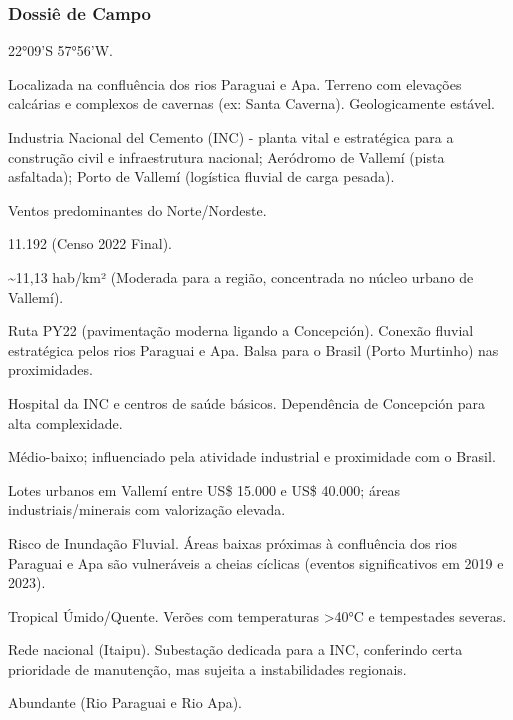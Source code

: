 \subsubsection{Dossiê de Campo}
\begin{description}[style=nextline,leftmargin=0.5cm,font=\bfseries]
\item[Coordenadas]  22°09'S 57°56'W.
\item[Topografia]  Localizada na confluência dos rios Paraguai e Apa. Terreno com elevações calcárias e complexos de cavernas (ex: Santa Caverna). Geologicamente estável.
\item[Alvos Estratégicos]  Industria Nacional del Cemento (INC) - planta vital e estratégica para a construção civil e infraestrutura nacional; Aeródromo de Vallemí (pista asfaltada); Porto de Vallemí (logística fluvial de carga pesada).
\item[Fallout]  Ventos predominantes do Norte/\allowbreak \allowbreak Nordeste.
\item[População]  11.192 (Censo 2022 Final).
\item[Densidade]  \textasciitilde 11,13 hab/\allowbreak \allowbreak km² (Moderada para a região, concentrada no núcleo urbano de Vallemí).
\item[Vias de Acesso]  Ruta PY22 (pavimentação moderna ligando a Concepción). Conexão fluvial estratégica pelos rios Paraguai e Apa. Balsa para o Brasil (Porto Murtinho) nas proximidades.
\item[Serviços]  Hospital da INC e centros de saúde básicos. Dependência de Concepción para alta complexidade.
\item[Custo de Vida]  Médio-baixo; influenciado pela atividade industrial e proximidade com o Brasil.
\item[Preço da Terra]  Lotes urbanos em Vallemí entre US\$ 15.000 e US\$ 40.000; áreas industriais/\allowbreak \allowbreak minerais com valorização elevada.
\item[Hidrologia]  Risco de Inundação Fluvial. Áreas baixas próximas à confluência dos rios Paraguai e Apa são vulneráveis a cheias cíclicas (eventos significativos em 2019 e 2023).
\item[Clima]  Tropical Úmido/\allowbreak \allowbreak Quente. Verões com temperaturas >40°C e tempestades severas.
\item[Energia]  Rede nacional (Itaipu). Subestação dedicada para a INC, conferindo certa prioridade de manutenção, mas sujeita a instabilidades regionais.
\item[Água]  Abundante (Rio Paraguai e Rio Apa).

\end{description}
